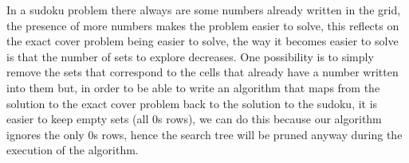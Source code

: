\documentclass{beamer}
\begin{document}
\begin{frame}{}
    In a sudoku problem there always are some numbers already written in the grid,
    the presence of more numbers makes the problem easier to solve, this reflects on the 
    exact cover problem being easier to solve, the way it becomes easier to solve is that
    the number of sets to explore decreases. One possibility is to simply remove the 
    sets that correspond to the cells that already have a number written into them but,
    in order to be able to write an algorithm that maps from the solution to the exact cover problem 
    back to the solution to the sudoku, it is easier to keep empty sets (all 0s rows),
    we can do this because our algorithm ignores the only 0s rows, hence the search tree will be pruned anyway
    during the execution of the algorithm.
\end{frame}
\end{document}
